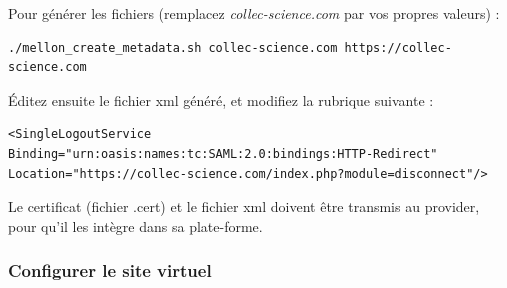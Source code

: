 Pour générer les fichiers (remplacez \textit{collec-science.com} par vos propres valeurs) : 
\begin{lstlisting}
./mellon_create_metadata.sh collec-science.com https://collec-science.com
\end{lstlisting}

Éditez ensuite le fichier xml généré, et modifiez la rubrique suivante :
\begin{lstlisting}
<SingleLogoutService Binding="urn:oasis:names:tc:SAML:2.0:bindings:HTTP-Redirect" Location="https://collec-science.com/index.php?module=disconnect"/>
\end{lstlisting}

Le certificat (fichier .cert) et le fichier xml doivent être transmis au provider, pour qu'il les intègre dans sa plate-forme.

\subsubsection{Configurer le site virtuel}

